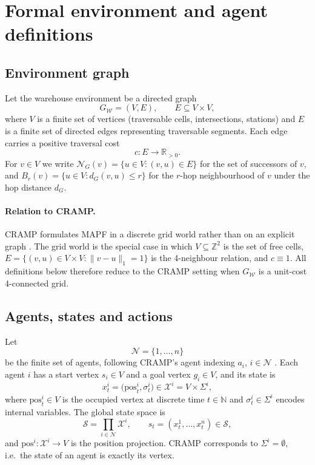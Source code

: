 \documentclass[../main.tex]{subfiles}
\begin{document}
\onecolumn
\section{Formal environment and agent definitions}

\subsection{Environment graph}
Let the warehouse environment be a directed graph
\[
  G_{\mathcal{W}} = (V, E), \qquad E \subseteq V \times V ,
\]
where $V$ is a finite set of vertices (traversable cells, intersections, stations)
and $E$ is a finite set of directed edges representing traversable segments.
Each edge carries a positive traversal cost
\[
  c : E \to \mathbb{R}_{>0}.
\]
For $v \in V$ we write $\mathcal{N}_{G}(v) = \{ u \in V : (v,u) \in E \}$ for the
set of successors of $v$, and
$B_r(v) = \{ u \in V : d_G(v,u) \le r \}$ for the $r$-hop neighbourhood of $v$
under the hop distance $d_G$.

\paragraph{Relation to CRAMP.}
CRAMP formulates MAPF in a discrete grid world rather than on an explicit graph
\cite{cramp}. The grid world is the special case in which
$V \subseteq \mathbb{Z}^2$ is the set of free cells,
$E = \{ (v,u) \in V \times V : \lVert v-u \rVert_1 = 1 \}$ is the
4-neighbour relation, and $c \equiv 1$. All definitions below therefore reduce
to the CRAMP setting when $G_{\mathcal{W}}$ is a unit-cost 4-connected grid.

\subsection{Agents, states and actions}
Let
\[
  \mathcal{N} = \{1, \dots, n\}
\]
be the finite set of agents, following CRAMP's agent indexing $a_i$,
$i \in \mathcal{N}$ \cite{cramp}. Each agent $i$ has a start vertex
$s_i \in V$ and a goal vertex $g_i \in V$, and its state is
\[
  x^i_t = \bigl( \mathrm{pos}^i_t, \sigma^i_t \bigr) \in \mathcal{X}^i = V \times \Sigma^i ,
\]
where $\mathrm{pos}^i_t \in V$ is the occupied vertex at discrete time
$t \in \mathbb{N}$ and $\sigma^i_t \in \Sigma^i$ encodes internal variables.
The global state space is
\[
  \mathcal{S} = \prod_{i \in \mathcal{N}} \mathcal{X}^i ,
  \qquad s_t = (x^1_t, \dots, x^n_t) \in \mathcal{S},
\]
and $\mathrm{pos}^i : \mathcal{X}^i \to V$ is the position projection.
CRAMP corresponds to $\Sigma^i = \emptyset$, i.e.\ the state of an agent is
exactly its vertex.
\end{document}
